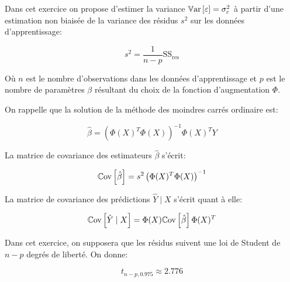\documentclass[solutions]{../exercices}
\begin{document}
\begin{exercice}
		Dans cet exercice on propose d'estimer la variance $\mathbb{V}\mathrm{ar}\left[\varepsilon\right] = \sigma_{\varepsilon}^2$ à partir d'une estimation non biaisée de la variance des résidus $s^2$ sur les données d'apprentissage:
		
		\begin{equation}
			s^2 = \frac{1}{n - p} \text{SS}_{\text{res}}
			\nonumber
		\end{equation}
		
		Où $n$ est le nombre d'observations dans les données d'apprentissage et $p$ est le nombre de paramètres $\beta$ résultant du choix de la fonction d'augmentation $\Phi$.
		
		On rappelle que la solution de la méthode des moindres carrés ordinaire est:
		
		\begin{equation}
			\hat{\beta} = \left(\Phi(X)^T \Phi(X)\right)^{-1} \Phi(X)^T Y
			\nonumber 
		\end{equation}
		
		La matrice de covariance des estimateurs $\hat{\beta}$ s'écrit:
		
		\begin{equation}
			\mathbb{C}\mathrm{ov} \left[\hat{\beta}\right] = s^2 \left(\Phi(X)^T \Phi(X)\right)^{-1}
			\nonumber
		\end{equation}
		
		La matrice de covariance des prédictions $\hat{Y} \mid X$ s'écrit quant à elle:
		
		\begin{equation}
			\mathbb{C}\mathrm{ov} \left[\hat{Y} \mid X \right] = \Phi(X) \mathbb{C}\mathrm{ov} \left[\hat{\beta}\right] \Phi(X)^T
			\nonumber
		\end{equation}
		
		Dans cet exercice, on supposera que les résidus suivent une loi de Student de $n - p$ degrés de liberté. On donne:
		
		\begin{equation}
			t_{n-p, 0.975} \approx 2.776
			\nonumber
		\end{equation}
		

\end{exercice}
\end{document}
